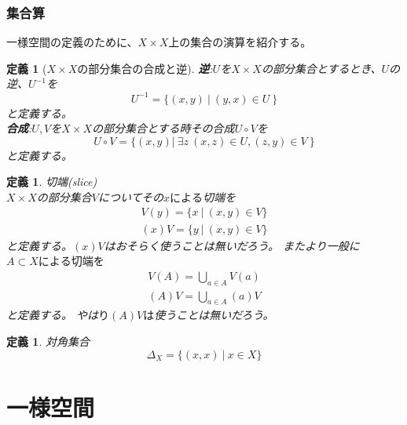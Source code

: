 \documentclass[leqno]{jsarticle}
\newtheorem{df}[thm]{定義}
\begin{document}
\section{集合算}一様空間の定義のために、$X\times X$上の集合の演算を紹介する。
\begin{df}[$X\times X$の部分集合の合成と逆]
{\bf 逆}:$U$を$X\times X$の部分集合とするとき、$U$の逆、$U^{-1}$を
\[
U^{-1}=\{(x,y)\ |\ (y,x)\in U\ \}
\]
と定義する。\\
{\bf 合成}:$U,V$を$X\times X$の部分集合とする時その合成$U\circ V$を
\[
U\circ V=\{(x,y)|\ \exists z\ (x,z)\in U,(z,y)\in V\ \}
\]と定義する。
\end{df}
\begin{df}切端(slice)\\
$X\times X$の部分集合$V$についてその$xによる$切端を
\begin{eqnarray*}
V(y)=\{x\ |\ (x,y)\in V\}\\
(x)V=\{y\ |\ (x,y)\in V\}
\end{eqnarray*}と定義する。$(x)V$はおそらく使うことは無いだろう。
またより一般に$A\subset Xによる切端を$
\begin{eqnarray*}
V(A)=\bigcup_{a\in A}V(a)\\
(A)V=\bigcup_{a\in A}(a)V
\end{eqnarray*}
と定義する。
やは$り(A)Vは$使うことは無いだろう。
\end{df}
\begin{df}対角集合
\[
\Delta_{X}=\{(x,x)\ |\ x\in X\}
\]
\end{df}






\newpage
\part{一様空間}
\end{document}
